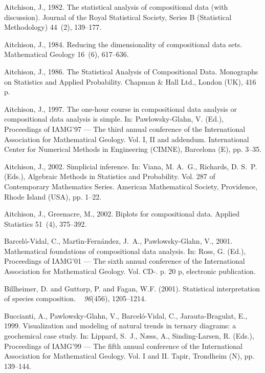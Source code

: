 \documentclass{article}
\begin{document}
\begin{thebibliography}{99}
 Aitchison, J., 1982. The statistical
  analysis of compositional data (with discussion). Journal of the Royal
  Statistical Society, Series B (Statistical Methodology) 44~(2), 139--177.

Aitchison, J., 1984. Reducing the dimensionality of compositional
data sets.
  Mathematical Geology 16~(6), 617--636.

Aitchison, J., 1986. The Statistical Analysis of Compositional
Data. Monographs
  on {S}tatistics and {A}pplied {P}robability. Chapman \& Hall Ltd., London
  (UK), 416 p.

Aitchison, J., 1997. The one-hour course in compositional data
analysis or
  compositional data analysis is simple. In: Pawlowsky-Glahn, V. (Ed.),
  Proceedings of IAMG'97 --- The third annual conference of the International
  Association for Mathematical Geology. Vol. I, II and addendum. International
  Center for Numerical Methods in Engineering (CIMNE), Barcelona (E), pp.
  3--35.

Aitchison, J., 2002. Simplicial inference. In: Viana, M. A.~G.,
Richards, D.
  S.~P. (Eds.), Algebraic Methods in Statistics and Probability. Vol. 287 of
  Contemporary Mathematics Series. American Mathematical Society, Providence,
  Rhode Island (USA), pp. 1--22.

Aitchison, J., Greenacre, M., 2002. Biplots for compositional
data. Applied Statistics 51~(4), 375--392.


Barcel\'o-Vidal, C., Mart{\'\i}n-Fern\'andez, J.~A.,
Pawlowsky-Glahn, V., 2001.
  Mathematical foundations of compositional data analysis. In: Ross, G. (Ed.),
  Proceedings of IAMG'01 --- The sixth annual conference of the International
  Association for Mathematical Geology. Vol. CD-. p. 20 p, electronic
  publication.

Billheimer, D. and Guttorp, P. and Fagan, W.F. (2001).
\newblock Statistical interpretation of species composition.
~{\em
  96\/}(456), 1205--1214.


Buccianti, A., Pawlowsky-Glahn, V., Barcel\'o-Vidal, C.,
Jarauta-Bragulat, E.,
  1999. Visualization and modeling of natural trends in ternary diagrams: a
  geochemical case study. In: Lippard, S.~J., N{\ae}ss, A., Sinding-Larsen, R.
  (Eds.), Proceedings of IAMG'99 --- The fifth annual conference of the
  International Association for Mathematical Geology. Vol. I and II. Tapir,
  Trondheim (N), pp. 139--144.


\end{thebibliography}
\end{document}
